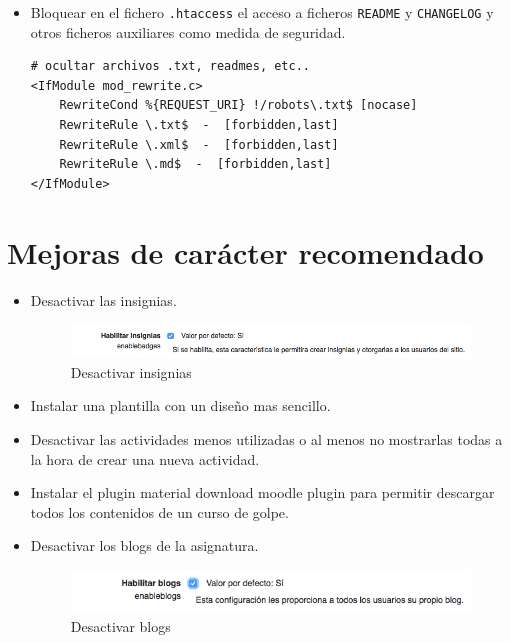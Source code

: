 \begin{itemize}
	\item Bloquear en el fichero \texttt{.htaccess} el acceso a ficheros \texttt{README} y \texttt{CHANGELOG} y otros ficheros auxiliares como medida de seguridad.
\begin{lstlisting}
# ocultar archivos .txt, readmes, etc..
<IfModule mod_rewrite.c>
    RewriteCond %{REQUEST_URI} !/robots\.txt$ [nocase]
    RewriteRule \.txt$  -  [forbidden,last]
    RewriteRule \.xml$  -  [forbidden,last]
    RewriteRule \.md$  -  [forbidden,last]
</IfModule>
\end{lstlisting}	
	
	
\end{itemize}


\section{Mejoras de carácter recomendado}

\begin{itemize}
	\item Desactivar las insignias.
\begin{figure}[H]
\centering
\includegraphics[width=1.0\textwidth]{../screenshots/desactivar_insignias}
\caption{Desactivar insignias}
\end{figure}	
	\item Instalar una plantilla con un diseño mas sencillo.
	\item Desactivar las actividades menos utilizadas o al menos no mostrarlas todas a la hora de crear una nueva actividad.
	\item Instalar el plugin material download moodle plugin\cite{moodleplugin} para permitir descargar todos los contenidos de un curso de golpe.
	\item Desactivar los blogs de la asignatura.
\begin{figure}[H]
\centering
\includegraphics[width=1.0\textwidth]{../screenshots/desactivar_blogs}
\caption{Desactivar blogs}
\end{figure}	
\end{itemize}

